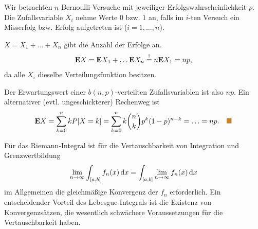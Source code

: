 \begin{bsp}
Wir betrachten $n$ Bernoulli-Versuche mit jeweiliger Erfolgswahrscheinlichkeit
$p$. Die Zufallsvariable $X_i$ nehme Werte $0$ bzw. $1$ an, falls im $i$-ten
Versuch ein Misserfolg bzw. Erfolg aufgetreten ist ($i=1,\ldots,n$).

$X=X_1+\ldots+X_n$ gibt die Anzahl der Erfolge an.
\begin{align*}
\textbf{E} X = \textbf{E} X_1 + \ldots \textbf{E} X_n \overset{!}{=} n \textbf{E} X_1 = np,
\end{align*}
da alle $X_i$ dieselbe Verteilungsfunktion besitzen.

Der Erwartungswert einer $b(n,p)$-verteilten Zufallsvariablen ist also $np$.
Ein alternativer (evtl. ungeschickterer) Rechenweg ist
\begin{align*}
\E X = \sum\limits_{k=0}^n kP[X=k] = \sum\limits_{k=0}^n
k\binom{n}{k}p^k(1-p)^{n-k} = \ldots = np.\bsphere
\end{align*}
\end{bsp}

Für das Riemann-Integral ist für die Vertauschbarkeit von
Integration und Grenzwertbildung
\begin{align*}
\lim\limits_{n\to\infty}\int_{[a,b]} f_n(x)\,\mathrm{d} x
=
\int_{[a,b]} \lim\limits_{n\to\infty}f_n(x)\,\mathrm{d} x
\end{align*}
im Allgemeinen die gleichmäßige Konvergenz der $f_n$ erforderlich.
Ein entscheidender Vorteil des Lebesgue-Integrals ist die Existenz von
Konvergenzsätzen, die wesentlich schwächere Voraussetzungen für die
Vertauschbarkeit haben.

